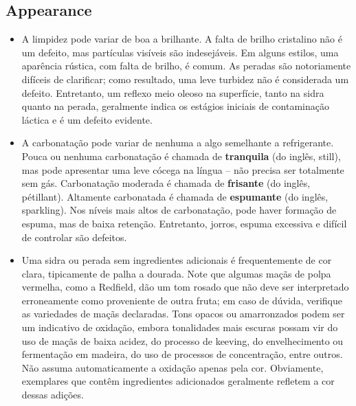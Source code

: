 \subsection*{Appearance}

\begin{itemize}
\item A limpidez pode variar de boa a brilhante. A falta de brilho cristalino não é um defeito, mas partículas visíveis são indesejáveis. Em alguns estilos, uma aparência rústica, com falta de brilho, é comum. As peradas são notoriamente difíceis de clarificar; como resultado, uma leve turbidez não é considerada um defeito. Entretanto, um reflexo meio oleoso na superfície, tanto na sidra quanto na perada, geralmente indica os estágios iniciais de contaminação láctica e é um defeito evidente.
\item A carbonatação pode variar de nenhuma a algo semelhante a refrigerante. Pouca ou nenhuma carbonatação é chamada de \textbf{tranquila} (do inglês, still), mas pode apresentar uma leve cócega na língua – não precisa ser totalmente sem gás. Carbonatação moderada é chamada de \textbf{frisante} (do inglês, pétillant). Altamente carbonatada é chamada de \textbf{espumante} (do inglês, sparkling). Nos níveis mais altos de carbonatação, pode haver formação de espuma, mas de baixa retenção. Entretanto, jorros, espuma excessiva e difícil de controlar são defeitos.
\item Uma sidra ou perada sem ingredientes adicionais é frequentemente de cor clara, tipicamente de palha a dourada. Note que algumas maçãs de polpa vermelha, como a Redfield, dão um tom rosado que não deve ser interpretado erroneamente como proveniente de outra fruta; em caso de dúvida, verifique as variedades de maçãs declaradas. Tons opacos ou amarronzados podem ser um indicativo de oxidação, embora tonalidades mais escuras possam vir do uso de maçãs de baixa acidez, do processo de keeving, do envelhecimento ou fermentação em madeira, do uso de processos de concentração, entre outros. Não assuma automaticamente a oxidação apenas pela cor. Obviamente, exemplares que contêm ingredientes adicionados geralmente refletem a cor dessas adições.
\end{itemize}
